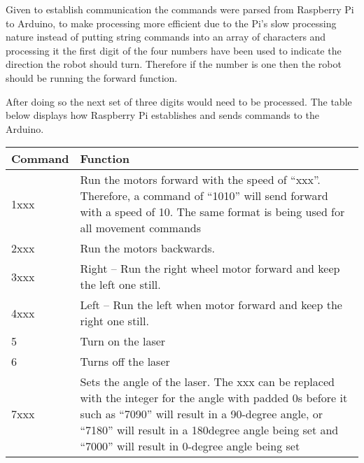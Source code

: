 \documentclass[11pt]{article}
\begin{document}
Given to establish communication the commands were parsed from Raspberry Pi to Arduino, to make processing more efficient due to the Pi's slow processing nature instead of putting string commands into an array of characters and processing it the first digit of the four numbers have been used to indicate the direction the robot should turn. Therefore if the number is one  then the robot should be running the forward function.

After doing so the next set of three digits would need to be processed. The table below displays how Raspberry Pi establishes and sends commands to the Arduino.

	\begin{center}
	\setlength{\tabcolsep}{10pt} %
	\renewcommand{\arraystretch}{1.5} %
	\begin{tabular}{ | m{3cm} |m{11cm} |  } 
		
		\hline
		 Command & Function   
		\\ 
		
		\hline
		
		1xxx & Run the motors forward with the speed of 
		“xxx”. Therefore, a command of “1010” will 
		send forward with a speed of 10. The same 
		format is being used for all movement 
		commands   \\ 
		
		\hline
		2xxx
		& Run the motors backwards.
		
		\\ 
		\hline
		
		
	
		3xxx
		
		
		&Right – Run the right wheel motor forward and 
		keep the left one still.
		
		\\ 
		\hline
		
	4xxx & Left – Run the left when motor forward and 
	keep the right one still.
		\\ 
		\hline
		5 & Turn on the laser 
		\\ 
		\hline
		
		
		

		6  & Turns off the laser\\ 
		\hline
		7xxx & Sets the angle of the laser. The xxx can be 
		replaced with the integer for the angle with 
		padded 0s before it such as “7090” will result in 
		a 90-degree angle, or “7180” will result in a 
		180degree angle being set and “7000” will 
		result in 0-degree angle being set
		\\
		\hline
		
	\end{tabular}
\end{center}
\end{document}
